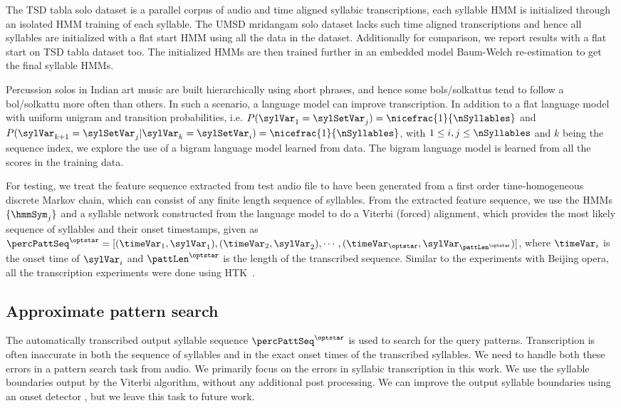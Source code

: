 The \acrshort{TSD} \gls{tabla} solo dataset is a parallel corpus of audio and time aligned syllabic transcriptions, each syllable \gls{HMM} is initialized through an isolated \gls{HMM} training of each syllable. The \acrshort{UMSD} mridangam solo dataset lacks such time aligned transcriptions and hence all syllables are initialized with a flat start \gls{HMM} using all the data in the dataset. Additionally for comparison, we report results with a flat start on \acrshort{TSD} \gls{tabla} dataset too. The initialized \glspl{HMM} are then trained further in an embedded model Baum-Welch re-estimation to get the final syllable \glspl{HMM}. 

Percussion solos in Indian art music are built hierarchically using short phrases, and hence some \glspl{bol}/\glspl{solkattu} tend to follow a \gls{bol}/\gls{solkattu} more often than others. In such a scenario, a language model can improve transcription. In addition to a flat language model with uniform unigram and transition probabilities, i.e. $P(\sylVar_1 = \sylSetVar_j) = \nicefrac{1}{\nSyllables}$ and $P(\sylVar_{k+1} = \sylSetVar_j | \sylVar_{k} = \sylSetVar_i) = \nicefrac{1}{\nSyllables}$, with $1 \leq i,j \leq \nSyllables$ and $k$ being the sequence index, we explore the use of a bigram language model learned from data. The bigram language model is learned from all the scores in the training data. 

For testing, we treat the feature sequence extracted from test audio file to have been generated from a first order time-homogeneous discrete Markov chain, which can consist of any finite length sequence of syllables. From the extracted feature sequence, we use the \glspl{HMM} $\{\hmmSym_j\}$ and a syllable network constructed from the language model to do a Viterbi (forced) alignment, which provides the most likely sequence of syllables and their onset timestamps, given as $\percPattSeq^{\optstar} = [(\timeVar_1,\sylVar_1), (\timeVar_2,\sylVar_2), \cdots, (\timeVar_{\optstar},\sylVar_{\pattLen^{\optstar}})]$, where $\timeVar_i$ is the onset time of $\sylVar_i$ and $\pattLen^{\optstar}$ is the length of the transcribed sequence. Similar to the experiments with Beijing opera, all the transcription experiments were done using \gls{HTK}~\cite{young:06:htkbook}. 
%
\subsection{Approximate pattern search}
The automatically transcribed output syllable sequence $\percPattSeq^{\optstar}$ is used to search for the query patterns. Transcription is often inaccurate in both the sequence of syllables and in the exact onset times of the transcribed syllables. We need to handle both these errors in a pattern search task from audio. We primarily focus on the errors in syllabic transcription in this work. We use the syllable boundaries output by the Viterbi algorithm, without any additional post processing. We can improve the output syllable boundaries using an onset detector \cite{bello:05:onset}, but we leave this task to future work. 

